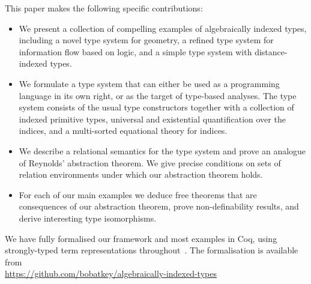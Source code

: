 This paper makes the following specific contributions:
\begin{itemize}
\item 
We present a collection of compelling examples of algebraically
indexed types, including a novel type system for geometry, a
refined type system for information flow based on logic, and a simple
type system with distance-indexed types.
\item 
We formulate a type system that can either be used as a programming
language in its own right, or as the target of type-based
analyses. The type system consists of the usual type constructors
together with a collection of indexed primitive types, universal and
existential quantification over the indices, and a multi-sorted
equational theory for indices.
\item
We describe a relational semantics for the type system and prove an
analogue of Reynolds' abstraction theorem. We give precise conditions
on sets of relation environments under which our abstraction theorem
holds.
\item
For each of our main examples we deduce free theorems that are
consequences of our abstraction theorem, prove non-definability
results, and derive interesting type isomorphisms.
\end{itemize}
We have fully formalised our framework and most examples in Coq,
using strongly-typed term representations
throughout~\cite{TypedSyntax}. The formalisation is available from
\\{\small \url{https://github.com/bobatkey/algebraically-indexed-types}}



